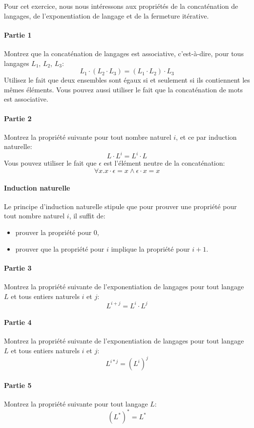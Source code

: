 \documentclass[12pt,french,a4paper]{article}
\begin{document}
\begin{question}
Pour cet exercice, nous nous intéressons aux propriétés de la concaténation de langages, de l'exponentiation de langage et de la fermeture itérative.

\paragraph{Partie 1} Montrez que la concaténation de langages est associative, c'est-à-dire, pour tous langages $L_1$, $L_2$, $L_3$:
\[
L_1 \cdot (L_2 \cdot L_3) = (L_1 \cdot L_2) \cdot L_3
\]
Utilisez le fait que deux ensembles sont égaux si et seulement si ils contiennent les mêmes éléments. Vous pouvez aussi utiliser le fait que la concaténation de mots est associative.

\paragraph{Partie 2} Montrez la propriété suivante pour tout nombre naturel $i$, et ce par induction naturelle:
\[
L \cdot L^i = L^i \cdot L 
\]
Vous pouvez utiliser le fait que $\epsilon$ est l'élément neutre de la concaténation:
\[
\forall x. x \cdot \epsilon = x \wedge \epsilon \cdot x = x
\]

\paragraph{Induction naturelle} Le principe d'induction naturelle stipule que pour prouver une propriété pour tout nombre naturel $i$, il suffit de:
\begin{itemize}
\item prouver la propriété pour $0$,
\item prouver que la propriété pour $i$ implique la propriété pour $i + 1$.
\end{itemize}

\paragraph{Partie 3} Montrez la propriété suivante de l'exponentiation de langages pour tout langage $L$ et tous entiers naturels $i$ et $j$:
\[
L^{i + j} = L^i \cdot L^j
\]

\paragraph{Partie 4} Montrez la propriété suivante de l'exponentiation de langages pour tout langage $L$ et tous entiers naturels $i$ et $j$:
\[
L^{i * j} = (L^i)^j
\]

\paragraph{Partie 5} Montrez la propriété suivante pour tout langage $L$:
\[
(L^*)^* = L^*
\]
\end{question}
\end{document}
